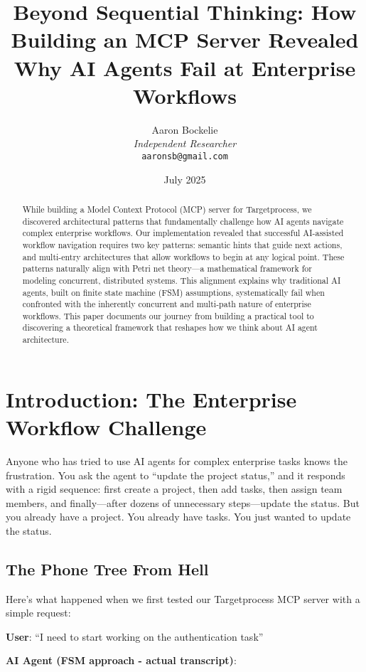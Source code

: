 \documentclass[11pt,a4paper]{article}
\title{Beyond Sequential Thinking: How Building an MCP Server Revealed Why AI Agents Fail at Enterprise Workflows}
\author{Aaron Bockelie\\
\textit{Independent Researcher}\\
\texttt{aaronsb@gmail.com}}
\date{July 2025}
\begin{document}
\maketitle

\begin{abstract}
While building a Model Context Protocol (MCP) server for Targetprocess, we discovered architectural patterns that fundamentally challenge how AI agents navigate complex enterprise workflows. Our implementation revealed that successful AI-assisted workflow navigation requires two key patterns: semantic hints that guide next actions, and multi-entry architectures that allow workflows to begin at any logical point. These patterns naturally align with Petri net theory—a mathematical framework for modeling concurrent, distributed systems. This alignment explains why traditional AI agents, built on finite state machine (FSM) assumptions, systematically fail when confronted with the inherently concurrent and multi-path nature of enterprise workflows. This paper documents our journey from building a practical tool to discovering a theoretical framework that reshapes how we think about AI agent architecture.
\end{abstract}

\section{Introduction: The Enterprise Workflow Challenge}

Anyone who has tried to use AI agents for complex enterprise tasks knows the frustration. You ask the agent to ``update the project status,'' and it responds with a rigid sequence: first create a project, then add tasks, then assign team members, and finally—after dozens of unnecessary steps—update the status. But you already have a project. You already have tasks. You just wanted to update the status.

\subsection{The Phone Tree From Hell}

Here's what happened when we first tested our Targetprocess MCP server with a simple request:

\textbf{User}: ``I need to start working on the authentication task''

\textbf{AI Agent (FSM approach - actual transcript)}:
\end{document}
